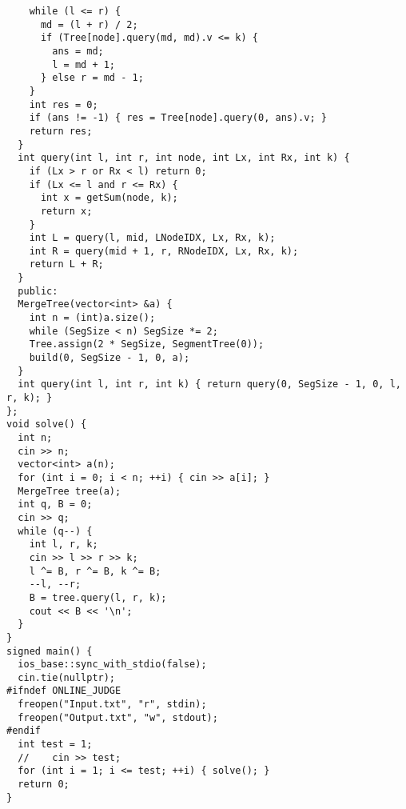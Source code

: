 \documentclass[twoside]{article}
\begin{document}
\begin{multicols*}{2}
\begin{verbatim}
    while (l <= r) {
      md = (l + r) / 2;
      if (Tree[node].query(md, md).v <= k) {
        ans = md;
        l = md + 1;
      } else r = md - 1;
    }
    int res = 0;
    if (ans != -1) { res = Tree[node].query(0, ans).v; }
    return res;
  }
  int query(int l, int r, int node, int Lx, int Rx, int k) {
    if (Lx > r or Rx < l) return 0;
    if (Lx <= l and r <= Rx) {
      int x = getSum(node, k);
      return x;
    }
    int L = query(l, mid, LNodeIDX, Lx, Rx, k);
    int R = query(mid + 1, r, RNodeIDX, Lx, Rx, k);
    return L + R;
  }
  public:
  MergeTree(vector<int> &a) {
    int n = (int)a.size();
    while (SegSize < n) SegSize *= 2;
    Tree.assign(2 * SegSize, SegmentTree(0));
    build(0, SegSize - 1, 0, a);
  }
  int query(int l, int r, int k) { return query(0, SegSize - 1, 0, l, r, k); }
};
void solve() {
  int n;
  cin >> n;
  vector<int> a(n);
  for (int i = 0; i < n; ++i) { cin >> a[i]; }
  MergeTree tree(a);
  int q, B = 0;
  cin >> q;
  while (q--) {
    int l, r, k;
    cin >> l >> r >> k;
    l ^= B, r ^= B, k ^= B;
    --l, --r;
    B = tree.query(l, r, k);
    cout << B << '\n';
  }
}
signed main() {
  ios_base::sync_with_stdio(false);
  cin.tie(nullptr);
#ifndef ONLINE_JUDGE
  freopen("Input.txt", "r", stdin);
  freopen("Output.txt", "w", stdout);
#endif
  int test = 1;
  //    cin >> test;
  for (int i = 1; i <= test; ++i) { solve(); }
  return 0;
}
\end{verbatim}

{
}
\end{multicols*}
\end{document}
